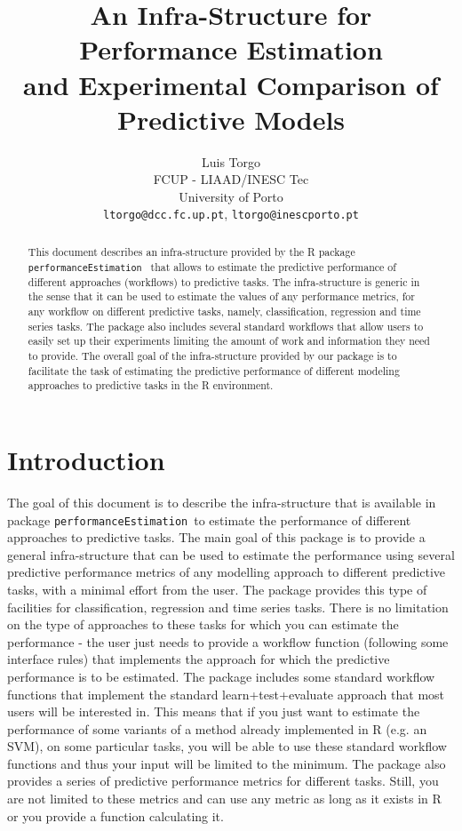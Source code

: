 \documentclass[10pt,a4paper]{article}\usepackage[]{graphicx}\usepackage[]{color}
\author{Luis Torgo\\FCUP - LIAAD/INESC Tec\\University of Porto\\
  \texttt{ltorgo@dcc.fc.up.pt}, \texttt{ltorgo@inescporto.pt}}
\title{An Infra-Structure for Performance Estimation\\ and Experimental Comparison of Predictive Models}
\newcommand{\PE}{package \texttt{performanceEstimation}\ }
\begin{document}
\maketitle

\begin{abstract}
  
  This document describes an infra-structure provided by the R \PE
  that allows to estimate the predictive performance of different
  approaches (workflows) to predictive tasks.  The infra-structure is
  generic in the sense that it can be used to estimate the values of
  any performance metrics, for any workflow on different predictive
  tasks, namely, classification, regression and time series tasks. The
  package also includes several standard workflows that allow users to
  easily set up their experiments limiting the amount of work and
  information they need to provide. The overall goal of the
  infra-structure provided by our package is to facilitate the task of
  estimating the predictive performance of different modeling
  approaches to predictive tasks in the R environment.
   
\end{abstract}

\section{Introduction}

The goal of this document is to describe the infra-structure that is
available in \PE to estimate the performance of different approaches
to predictive tasks.  The main goal of this package is to provide a
general infra-structure that can be used to estimate the performance
using several predictive performance metrics of any modelling approach
to different predictive tasks, with a minimal effort from the
user. The package provides this type of facilities for classification,
regression and time series tasks. There is no limitation on the type
of approaches to these tasks for which you can estimate the
performance - the user just needs to provide a workflow function
(following some interface rules) that implements the approach for
which the predictive performance is to be estimated. The package
includes some standard workflow functions that implement the standard
learn+test+evaluate approach that most users will be interested
in. This means that if you just want to estimate the performance of
some variants of a method already implemented in R (e.g. an SVM), on
some particular tasks, you will be able to use these standard workflow
functions and thus your input will be limited to the minimum. The
package also provides a series of predictive performance metrics for
different tasks. Still, you are not limited to these metrics and can
use any metric as long as it exists in R or you provide a function
calculating it.
\end{document}
